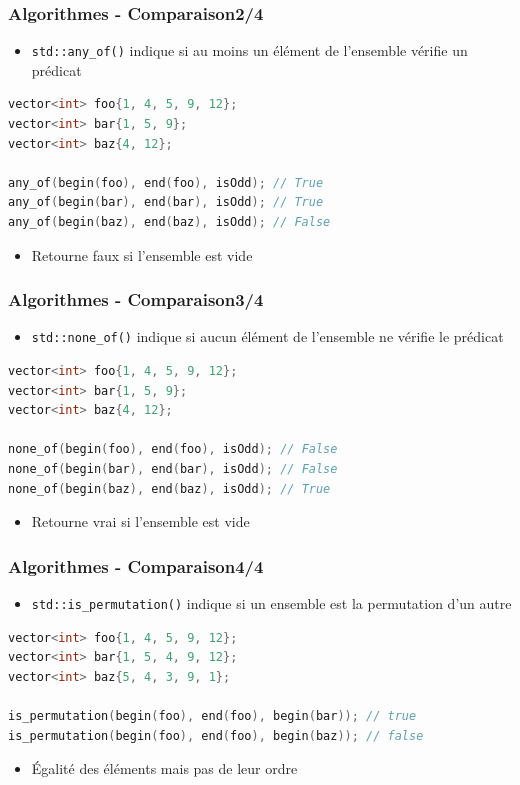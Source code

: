 \documentclass[C++.tex]{subfiles}
\begin{document}
\begin{frame}[fragile]
	\frametitle{Algorithmes - Comparaison\titlehfill{}2/4}
	\begin{itemize}
		\item \lstinline|std::any_of()| indique si au moins un élément de l'ensemble vérifie un prédicat
	\end{itemize}

	\begin{lstlisting}[language=C++]
vector<int> foo{1, 4, 5, 9, 12};
vector<int> bar{1, 5, 9};
vector<int> baz{4, 12};

any_of(begin(foo), end(foo), isOdd); // True
any_of(begin(bar), end(bar), isOdd); // True
any_of(begin(baz), end(baz), isOdd); // False\end{lstlisting}

	\begin{itemize}
		\item Retourne faux si l'ensemble est vide
	\end{itemize}
\end{frame}

\begin{frame}[fragile]
	\frametitle{Algorithmes - Comparaison\titlehfill{}3/4}
	\begin{itemize}
		\item \lstinline|std::none_of()| indique si aucun élément de l'ensemble ne vérifie le prédicat
	\end{itemize}

	\begin{lstlisting}[language=C++]
vector<int> foo{1, 4, 5, 9, 12};
vector<int> bar{1, 5, 9};
vector<int> baz{4, 12};

none_of(begin(foo), end(foo), isOdd); // False
none_of(begin(bar), end(bar), isOdd); // False
none_of(begin(baz), end(baz), isOdd); // True\end{lstlisting}

	\begin{itemize}
		\item Retourne vrai si l'ensemble est vide
	\end{itemize}
\end{frame}

\begin{frame}[fragile]
	\frametitle{Algorithmes - Comparaison\titlehfill{}4/4}
	\begin{itemize}
		\item \lstinline|std::is_permutation()| indique si un ensemble est la permutation d'un autre
	\end{itemize}

	\begin{lstlisting}[language=C++]
vector<int> foo{1, 4, 5, 9, 12};
vector<int> bar{1, 5, 4, 9, 12};
vector<int> baz{5, 4, 3, 9, 1};

is_permutation(begin(foo), end(foo), begin(bar)); // true
is_permutation(begin(foo), end(foo), begin(baz)); // false\end{lstlisting}

	\begin{itemize}
		\item Égalité des éléments mais pas de leur ordre
	\end{itemize}
\end{frame}
\end{document}
